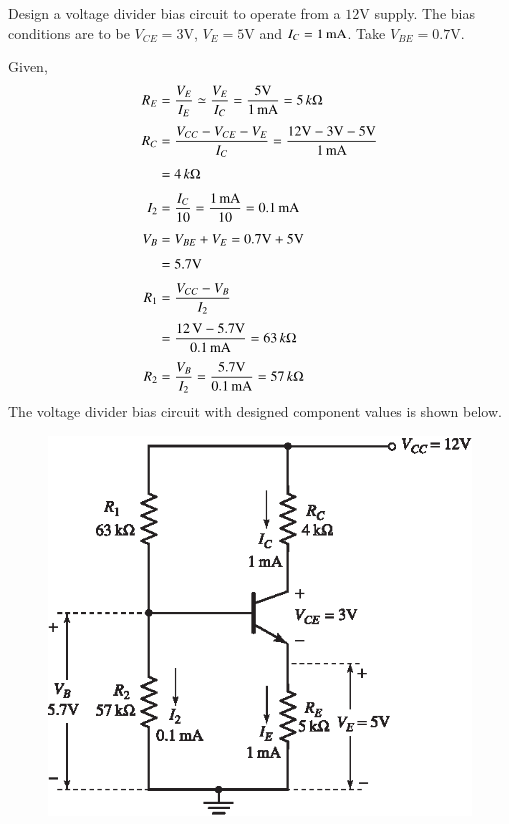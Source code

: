 \eject

\begin{example}\label{exam4.19}
Design a voltage divider bias circuit to operate from a $12\text{V}$ supply. The bias conditions are to be $V_{CE}=3\text{V}$, $V_{E}=5\text{V}$ and $I_{C}=1\text{\,mA}$. Take $V_{BE}=0.7\text{V}$.
\end{example}

\begin{solution}
Given,
\begin{align*}
R_{E} &= \frac{V_{E}}{I_{E}}\simeq \frac{V_{E}}{I_{C}}=\frac{5\text{V}}{1\text{\,mA}}=5\, k\Omega\\[3pt]
R_{C} &= \frac{V_{CC}-V_{CE}-V_{E}}{I_{C}}
= \frac{12\text{V}-3\text{V}-5\text{V}}{1\text{\,mA}}\\[3pt]
&= 4\, k\Omega\\[3pt]
I_{2} &= \frac{I_{C}}{10}=\frac{1\text{\,mA}}{10}=0.1\text{\,mA}\\[3pt]
V_{B} &= V_{BE}+V_{E}= 0.7\text{V}+5\text{V}\\[3pt]
&= 5.7\text{V}\\[3pt]
R_{1} &= \frac{V_{CC}-V_{B}}{I_{2}}\\[3pt]
&= \frac{12\text{\,V}-5.7\text{V}}{0.1\text{\,mA}}=63\, k\Omega\\[3pt]
R_{2} &= \frac{V_{B}}{I_{2}}= \frac{5.7\text{V}}{0.1\text{\,mA}}=57\, k\Omega
\end{align*}
The voltage divider bias circuit with designed component values is shown below.
\begin{figure}[H]
\centering
\includegraphics[scale=1.05]{chap3/S3-EE-03-IN030.eps}
\end{figure}
\vskip -1cm
\end{solution}

